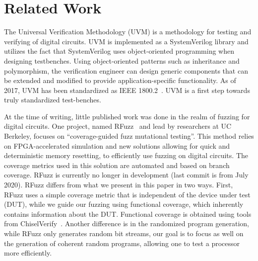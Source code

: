 \documentclass[conference]{IEEEtran}
\newcommand{\martin}[1]{{\color{blue} Martin: #1}}
\newcommand{\andrew}[1]{{\color{red} Andrew: #1}}
\begin{document}
\section{Related Work}
\label{sec:related}
%

The Universal Verification Methodology (UVM) is a methodology for testing and verifying of digital circuits.
UVM is implemented as a SystemVerilog library and utilizes the fact that SystemVerilog uses object-oriented programming when designing testbenches.
Using object-oriented patterns such as inheritance and polymorphism, the verification engineer can design generic components that can be extended and modified to provide application-specific functionality.
As of 2017, UVM has been standardized as IEEE 1800.2~\cite{IEEE:18002}.
UVM is a first step towards truly standardized test-benches.

At the time of writing, little published work was done in the realm of fuzzing for digital circuits.
One project, named RFuzz~\cite{rfuzz2018} and lead by researchers at UC Berkeley, focuses on ``coverage-guided fuzz mutational testing''. This method relies on FPGA-accelerated simulation and new solutions allowing for quick and deterministic memory resetting, to efficiently use fuzzing on digital circuits. The coverage metrics used in this solution are automated and based on branch coverage. RFuzz is currently no longer in development (last commit is from July 2020). RFuzz differs from what we present in this paper in two ways. First, RFuzz uses a simple coverage metric that is independent of the device under test (DUT), while we guide our fuzzing using functional coverage, which inherently contains information about the DUT. Functional coverage is obtained using tools from ChiselVerify~\cite{verify:chisel:2020, dobis2021opensource}.
Another difference is in the randomized program generation, while RFuzz only generates random bit streams, our goal is to focus as well on the generation of coherent random programs, allowing one to test a processor more efficiently. 
\end{document}
